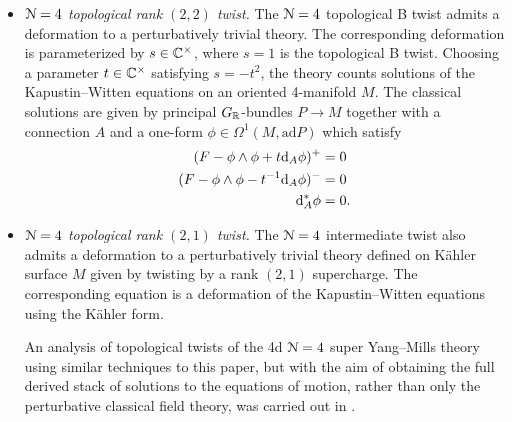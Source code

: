 \documentclass[10pt, oneside]{article}
\begin{document}
\begin{itemize}
 \item \emph{$\mathcal N=4$ topological rank $(2, 2)$ twist.} The $\mathcal N=4$ topological B twist admits a deformation to a perturbatively trivial theory. The corresponding deformation is parameterized by $s\in\mathbb C^\times$, where $s=1$ is the topological B twist. Choosing a parameter $t\in\mathbb C^\times$ satisfying $s=-t^2$, the theory counts solutions of the Kapustin--Witten equations on an oriented 4-manifold $M$. The classical solutions are given by principal $G_\mathbb R$-bundles $P\rightarrow M$ together with a connection $A$ and a one-form $\phi\in\Omega^1(M, \mathrm{ad} P)$ which satisfy
\begin{align}
(F-\phi\wedge\phi +t {\rm d}_A \phi)^+ &= 0 \\
(F-\phi\wedge\phi -t^{-1}{\rm d}_A \phi)^- &= 0 \\
{\rm d}^*_A \phi &= 0.
\end{align}

\item \emph{$\mathcal N=4$ topological rank $(2, 1)$ twist.} The $\mathcal N=4$ intermediate twist also admits a deformation to a perturbatively trivial theory defined on K\"ahler surface $M$ given by twisting by a rank $(2, 1)$ supercharge. The corresponding equation is a deformation of the Kapustin--Witten equations using the K\"ahler form.

An analysis of topological twists of the 4d $\mathcal N=4$ super Yang--Mills theory using similar techniques to this paper, but with the aim of obtaining the full derived stack of solutions to the equations of motion, rather than only the perturbative classical field theory, was carried out in \cite{ElliottYoo1}.
\end{itemize}
\end{document}

